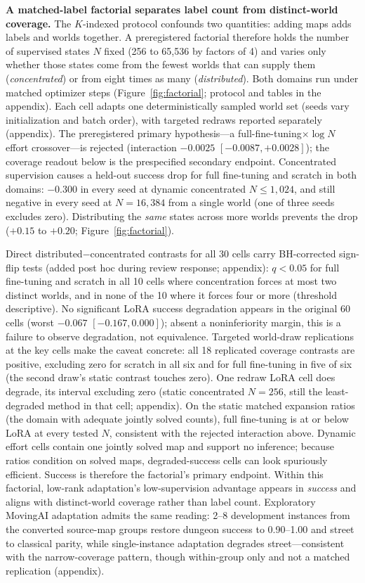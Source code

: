\documentclass[letterpaper]{article} %
\begin{document}
\textbf{A matched-label factorial separates label count from distinct-world coverage.} The $K$-indexed protocol confounds two quantities: adding maps adds labels and worlds together. A preregistered factorial therefore holds the number of supervised states $N$ fixed (256 to 65{,}536 by factors of 4) and varies only whether those states come from the fewest worlds that can supply them (\emph{concentrated}) or from eight times as many (\emph{distributed}). Both domains run under matched optimizer steps (Figure~\ref{fig:factorial}; protocol and tables in the appendix). Each cell adapts one deterministically sampled world set (seeds vary initialization and batch order), with targeted redraws reported separately (appendix). The preregistered primary hypothesis---a full-fine-tuning$\times\log N$ effort crossover---is rejected (interaction $-0.0025$ $[-0.0087, +0.0028]$); the coverage readout below is the prespecified secondary endpoint. Concentrated supervision causes a held-out success drop for full fine-tuning and scratch in both domains: $-0.300$ in every seed at dynamic concentrated $N \leq 1{,}024$, and still negative in every seed at $N{=}16{,}384$ from a single world (one of three seeds excludes zero). Distributing the \emph{same} states across more worlds prevents the drop ($+0.15$ to $+0.20$; Figure~\ref{fig:factorial}).

Direct distributed$-$concentrated contrasts for all 30 cells carry BH-corrected sign-flip tests (added post hoc during review response; appendix): $q{<}0.05$ for full fine-tuning and scratch in all 10 cells where concentration forces at most two distinct worlds, and in none of the 10 where it forces four or more (threshold descriptive). No significant LoRA success degradation appears in the original 60 cells (worst $-0.067$ $[-0.167, 0.000]$); absent a noninferiority margin, this is a failure to observe degradation, not equivalence. Targeted world-draw replications at the key cells make the caveat concrete: all 18 replicated coverage contrasts are positive, excluding zero for scratch in all six and for full fine-tuning in five of six (the second draw's static contrast touches zero). One redraw LoRA cell does degrade, its interval excluding zero (static concentrated $N{=}256$, still the least-degraded method in that cell; appendix). On the static matched expansion ratios (the domain with adequate jointly solved counts), full fine-tuning is at or below LoRA at every tested $N$, consistent with the rejected interaction above. Dynamic effort cells contain one jointly solved map and support no inference; because ratios condition on solved maps, degraded-success cells can look spuriously efficient. Success is therefore the factorial's primary endpoint. Within this factorial, low-rank adaptation's low-supervision advantage appears in \emph{success} and aligns with distinct-world coverage rather than label count. Exploratory MovingAI adaptation admits the same reading: 2--8 development instances from the converted source-map groups restore dungeon success to 0.90--1.00 and street to classical parity, while single-instance adaptation degrades street---consistent with the narrow-coverage pattern, though within-group only and not a matched replication (appendix).
\end{document}
